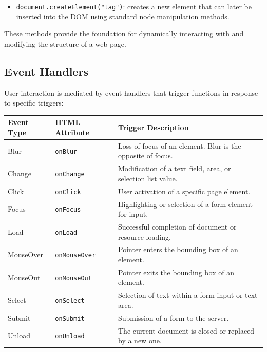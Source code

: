 \documentclass{scrbook}
\begin{document}
	\begin{itemize}
		\item \texttt{document.createElement("tag")}: creates a new element that can later be inserted into the DOM using standard node manipulation methods.
	\end{itemize}
	
	These methods provide the foundation for dynamically interacting with and modifying the structure of a web page.
	
	\subsection{Event Handlers}
	
	User interaction is mediated by event handlers that trigger functions in response to specific triggers:
	
	\begin{table}[!h]
	\centering
	\begin{tabular}{|l|l|p{8cm}|}
	\hline
	\textbf{Event Type} & \textbf{HTML Attribute} & \textbf{Trigger Description} \\
	\hline
	Blur     & \texttt{onBlur}    & Loss of focus of an element. Blur is the opposite of focus. \\
	\hline
	Change     & \texttt{onChange}    & Modification of a text field, area, or selection list value. \\
	\hline
	Click      & \texttt{onClick}     & User activation of a specific page element. \\
	\hline
	Focus      & \texttt{onFocus}     & Highlighting or selection of a form element for input. \\
	\hline
	Load       & \texttt{onLoad}      & Successful completion of document or resource loading. \\
	\hline
	MouseOver  & \texttt{onMouseOver} & Pointer enters the bounding box of an element. \\
	\hline
	MouseOut   & \texttt{onMouseOut}  & Pointer exits the bounding box of an element. \\
	\hline
	Select     & \texttt{onSelect}    & Selection of text within a form input or text area. \\
	\hline
	Submit     & \texttt{onSubmit}    & Submission of a form to the server. \\
	\hline
	Unload     & \texttt{onUnload}    & The current document is closed or replaced by a new one. \\
	\hline
	\end{tabular}
	\end{table}
	
\end{document}
